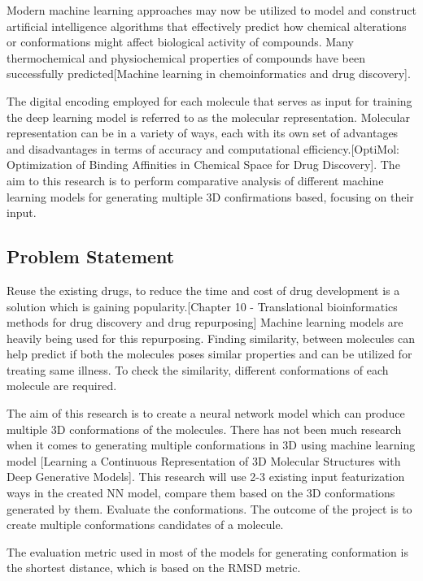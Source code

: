 \documentclass[rnd]{mas_proposal}
\begin{document}
    Modern machine learning approaches may now be utilized to model and construct artificial intelligence algorithms that effectively predict how chemical alterations or conformations might affect biological activity of compounds. Many thermochemical and physiochemical properties of compounds have been successfully predicted[Machine learning in chemoinformatics and drug discovery]. 
    
    The digital encoding employed for each molecule that serves as input for training the deep learning model is referred to as the molecular representation. Molecular representation can be in a variety of ways, each with its own set of advantages and disadvantages in terms of accuracy and computational efficiency.[OptiMol: Optimization of Binding Affinities in Chemical Space for Drug Discovery]. The aim to this research is to perform comparative analysis of different machine learning models for generating multiple 3D confirmations based, focusing on their input.
    
\subsection{Problem Statement}

    
    Reuse the existing drugs, to reduce the time and cost of drug development is a solution which is gaining popularity.[Chapter 10 - Translational bioinformatics methods for drug discovery and drug repurposing] Machine learning models are heavily being used for this repurposing.  Finding similarity, between molecules can help predict if both the molecules poses similar properties and can be utilized for treating same illness. To check the similarity, different conformations of each molecule are required. 
    
    The aim of this research is to create a neural network model which can produce multiple 3D conformations of the molecules. There has not been much research when it comes to generating multiple conformations in 3D using machine learning model [Learning a Continuous Representation of 3D Molecular Structures with Deep Generative Models]. This research will use 2-3  existing input featurization ways in the created NN model, compare them based on the 3D conformations generated by them. Evaluate the conformations. The outcome of the project is to create multiple conformations candidates of a molecule.
    

    The evaluation metric used in most of the models for generating conformation is the shortest distance, which is based on the RMSD metric.
\end{document}
